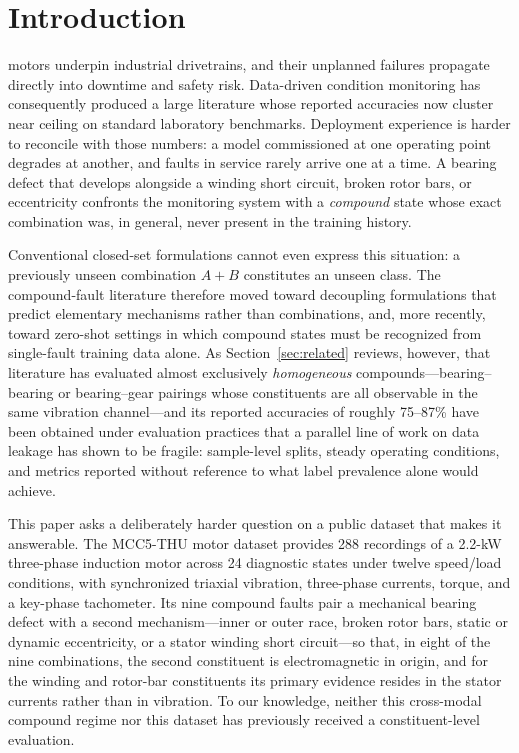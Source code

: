 \section{Introduction}
\label{sec:intro}

 motors underpin industrial drivetrains, and their
unplanned failures propagate directly into downtime and safety risk.
Data-driven condition monitoring has consequently produced a large
literature whose reported accuracies now cluster near ceiling on standard
laboratory benchmarks. Deployment experience is harder to reconcile with
those numbers: a model commissioned at one operating point degrades at
another, and faults in service rarely arrive one at a time. A bearing defect
that develops alongside a winding short circuit, broken rotor bars, or
eccentricity confronts the monitoring system with a \emph{compound} state
whose exact combination was, in general, never present in the training
history.

Conventional closed-set formulations cannot even express this situation: a
previously unseen combination $A{+}B$ constitutes an unseen class. The
compound-fault literature therefore moved toward decoupling formulations
that predict elementary mechanisms rather than combinations, and, more
recently, toward zero-shot settings in which compound states must be
recognized from single-fault training data alone. As
Section~\ref{sec:related} reviews, however, that literature has evaluated
almost exclusively \emph{homogeneous} compounds---bearing--bearing or
bearing--gear pairings whose constituents are all observable in the same
vibration channel---and its reported accuracies of roughly 75--87\% have
been obtained under evaluation practices that a parallel line of work on
data leakage has shown to be fragile: sample-level splits, steady operating
conditions, and metrics reported without reference to what label prevalence
alone would achieve.

This paper asks a deliberately harder question on a public dataset that
makes it answerable. The MCC5-THU motor dataset \cite{chen2026} provides 288
recordings of a 2.2-kW three-phase induction motor across 24 diagnostic
states under twelve speed/load conditions, with synchronized triaxial
vibration, three-phase currents, torque, and a key-phase tachometer. Its
nine compound faults pair a mechanical bearing defect with a second
mechanism---inner or outer race, broken rotor bars, static or dynamic
eccentricity, or a stator winding short circuit---so that, in eight of the
nine combinations, the second constituent is electromagnetic in origin, and
for the winding and rotor-bar constituents its primary evidence resides in
the stator currents rather than in vibration. To our knowledge, neither this
cross-modal compound regime nor this dataset has previously received a
constituent-level evaluation.


